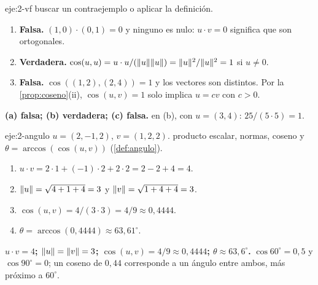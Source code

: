 \begin{solucion}{eje:2-vf}
\planteamiento buscar un contraejemplo o aplicar la definición.
\pasos
\begin{enumerate}[label=(\alph*)]
  \item \textbf{Falsa.} $(1,0)\cdot(0,1)=0$ y ninguno es nulo: $u\cdot v=0$ significa que son ortogonales.
  \item \textbf{Verdadera.} $\cos(u,u)=u\cdot u/(\lVert u\rVert\lVert u\rVert)=\lVert u\rVert^{2}/\lVert u\rVert^{2}=1$ si $u\neq 0$.
  \item \textbf{Falsa.} $\cos((1,2),(2,4))=1$ y los vectores son distintos. Por la \cref{prop:coseno}(ii), $\cos(u,v)=1$ solo implica $u=cv$ con $c>0$.
\end{enumerate}
\resultado \textbf{(a) falsa; (b) verdadera; (c) falsa.}
\comprobacion en (b), con $u=(3,4)$: $25/(5\cdot 5)=1$.
\end{solucion}

\begin{solucion}{eje:2-angulo}
\datos $u=(2,-1,2)$, $v=(1,2,2)$.
\planteamiento producto escalar, normas, coseno y $\theta=\arccos(\cos(u,v))$ (\cref{def:angulo}).
\pasos
\begin{enumerate}[label=\arabic*.]
  \item $u\cdot v=2\cdot 1+(-1)\cdot 2+2\cdot 2=2-2+4=4$.
  \item $\lVert u\rVert=\sqrt{4+1+4}=3$ y $\lVert v\rVert=\sqrt{1+4+4}=3$.
  \item $\cos(u,v)=4/(3\cdot 3)=4/9\approx 0{,}4444$.
  \item $\theta=\arccos(0{,}4444)\approx 63{,}61^\circ$.
\end{enumerate}
\resultado \textbf{$u\cdot v=4$; $\lVert u\rVert=\lVert v\rVert=3$; $\cos(u,v)=4/9\approx 0{,}4444$; $\theta\approx 63{,}6^\circ$.}
\comprobacion $\cos 60^\circ=0{,}5$ y $\cos 90^\circ=0$; un coseno de $0{,}44$ corresponde a un ángulo entre ambos, más próximo a $60^\circ$.
\end{solucion}

